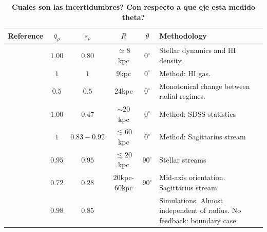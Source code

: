 \documentclass[a4paper,fleqn,usenatbib]{mnras}
\begin{document}
\begin{table}
\begin{tabular}{|l|cc|c|c|p{7cm}|}\hline
Reference&$q_{\rho}$&$s_{\rho}$&$R$&$\theta$&
Methodology\\ 
\hline \hline \citet{Olling_and_Merrifield_2000}& $1.00$
& $0.80$ &  $\simeq 8$kpc & $0^{\circ}$&Stellar dynamics and HI
density. \\

\multirow{2}{*}{\citet{Banerjee_and_Chanda_2011}}&${1}$&${1}$&$9$kpc&$0^{\circ}$&Method:
HI
gas. \\ &${0.5}$&${0.5}$&$24$kpc&$0^{\circ}$&Monotonical
change between radial regimes.\\

\citet{Loebman_et_al._2012}&${1.00}$&${0.47}$&$\sim
20$kpc &$0^{\circ}$&Method: SDSS statistics\\

\cite{Johnston_et_al._2005}&${1}$&$0.83-0.92$&$\lesssim
60$kpc&$0^{\circ}$&Method: Sagittarius stream\\

\citet{Bovy_et_el._2016}&${0.95}$&${0.95}$&$\lesssim
20$kpc&$90^{\circ}$ & Stellar streams\\

\citet{Deg_and_Widrow_2013}&$0.72$&$0.28$&
$20$kpc-$60$kpc$ $&$90^{\circ}$&
Mid-axis orientation. Sagittarius stream\\\hline\hline

\citet{Abadi_et_al._2010} &${0.98}$&${0.85}$& & & Simulations. Almost
  independent of radius. No feedback: boundary case\\\hline

\end{tabular}
\caption{{\bf Cuales son las incertidumbres? Con respecto a que eje
    esta medido theta?}}
\end{table}
\end{document}

